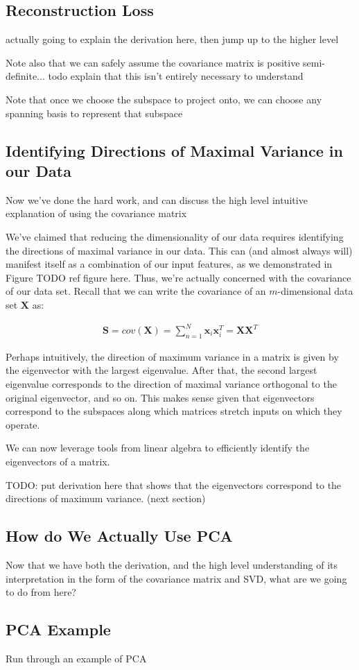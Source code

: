 \subsection{Reconstruction Loss}
actually going to explain the derivation here, then jump up to the higher level

Note also that we can safely assume the covariance matrix is positive semi-definite... todo explain that this isn't entirely necessary to understand

Note that once we choose the subspace to project onto, we can choose any spanning basis to represent that subspace

\subsection{Identifying Directions of Maximal Variance in our Data}
Now we've done the hard work, and can discuss the high level intuitive explanation of using the covariance matrix

We've claimed that reducing the dimensionality of our data requires identifying the directions of maximal variance in our data. This can (and almost always will) manifest itself as a combination of our input features, as we demonstrated in Figure TODO ref figure here. Thus, we're actually concerned with the covariance of our data set. Recall that we can write the covariance of an $m$-dimensional data set $\textbf{X}$ as:

\begin{align*}
	\textbf{S} = cov(\textbf{X}) = \sum_{n=1}^{N} \textbf{x}_{i} \textbf{x}_{i}^{T} = \textbf{X}\textbf{X}^{T}
\end{align*}


Perhaps intuitively, the direction of maximum variance in a matrix is given by the eigenvector with the largest eigenvalue. After that, the second largest eigenvalue corresponds to the direction of maximal variance orthogonal to the original eigenvector, and so on. This makes sense given that eigenvectors correspond to the subspaces along which matrices stretch inputs on which they operate.

We can now leverage tools from linear algebra to efficiently identify the eigenvectors of a matrix.

TODO: put derivation here that shows that the eigenvectors correspond to the directions of maximum variance. (next section)

\subsection{How do We Actually Use PCA}
Now that we have both the derivation, and the high level understanding of its interpretation in the form of the covariance matrix and SVD, what are we going to do from here?

\subsection{PCA Example}
Run through an example of PCA
